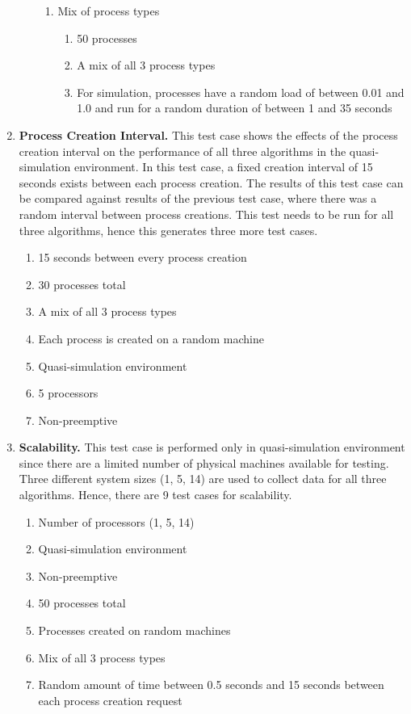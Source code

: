 \documentclass{report}
\begin{document}
\begin{enumerate}
\begin{enumerate}
\begin{enumerate}
	   \item Mix of process types
	   \begin{enumerate}
		\item 50 processes
		\item A mix of all 3 process types
		\item For simulation, processes have a random load of 
		between 0.01 and 1.0 and run for a random duration
		of between 1 and 35 seconds
	   \end{enumerate}
	\end{enumerate}
  \end{enumerate}


\item \textbf{Process Creation Interval.}  This test case shows the effects
	of the process creation interval on the performance of all three
	algorithms in the quasi-simulation environment.  In this test case,
	a fixed creation interval of 15 seconds exists between each process
	creation.  The results of this test case can be compared against
	results of the previous test case, where there was a random interval
	between process creations.  This test needs to be run for all three
	algorithms, hence this generates three more test cases.

  \begin{enumerate}
	\item 15 seconds between every process creation
	\item 30 processes total
	\item A mix of all 3 process types
	\item Each process is created on a random machine
	\item Quasi-simulation environment
	\item 5 processors
	\item Non-preemptive
  \end{enumerate}
	

\item \textbf{Scalability.}  This test case is performed only
in quasi-simulation environment since there are a limited number of physical
machines available for testing.  Three different system sizes (1, 5, 14) are
used to collect data for all three algorithms.  Hence, there are 9 test
cases for scalability.

  \begin{enumerate}
	\item Number of processors (1, 5, 14)
	\item Quasi-simulation environment
	\item Non-preemptive
	\item 50 processes total
	\item Processes created on random machines
	\item Mix of all 3 process types
	\item Random amount of time between 0.5 seconds and 15 seconds 
		between each process creation request
  \end{enumerate}



\end{enumerate}
\end{document}

